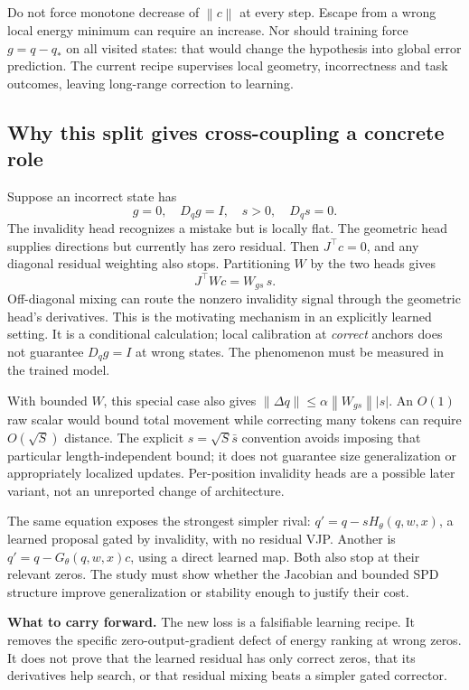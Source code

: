 \documentclass[11pt,a4paper]{article}
\newcommand{\takeaway}[1]{\par\smallskip\noindent\colorbox{pale}{\parbox{\dimexpr\linewidth-2\fboxsep\relax}{\textbf{What to carry forward.} #1}}\par\smallskip}
\newcommand{\norm}[1]{\left\lVert #1\right\rVert}
\begin{document}
Do not force monotone decrease of $\norm{c}$ at every step. Escape from a wrong local energy minimum can require an increase. Nor should training force $g=q-q_*$ on all visited states: that would change the hypothesis into global error prediction. The current recipe supervises local geometry, incorrectness and task outcomes, leaving long-range correction to learning.

\subsection{Why this split gives cross-coupling a concrete role}
Suppose an incorrect state has
\[
g=0,\quad D_qg=I,\quad s>0,\quad D_qs=0.
\]
The invalidity head recognizes a mistake but is locally flat. The geometric head supplies directions but currently has zero residual. Then $J^\top c=0$, and any diagonal residual weighting also stops. Partitioning $W$ by the two heads gives
\begin{equation}
J^\top Wc=W_{gs}\,s.\label{eq:bridge}
\end{equation}
Off-diagonal mixing can route the nonzero invalidity signal through the geometric head's derivatives. This is the motivating mechanism in an explicitly learned setting. It is a conditional calculation; local calibration at \emph{correct} anchors does not guarantee $D_qg=I$ at wrong states. The phenomenon must be measured in the trained model.

With bounded $W$, this special case also gives $\norm{\Delta q}\le\alpha\norm{W_{gs}}\vert s\vert$. An $O(1)$ raw scalar would bound total movement while correcting many tokens can require $O(\sqrt S)$ distance. The explicit $s=\sqrt S\bar s$ convention avoids imposing that particular length-independent bound; it does not guarantee size generalization or appropriately localized updates. Per-position invalidity heads are a possible later variant, not an unreported change of architecture.

The same equation exposes the strongest simpler rival: $q'=q-sH_\theta(q,w,x)$, a learned proposal gated by invalidity, with no residual VJP. Another is $q'=q-G_\theta(q,w,x)c$, using a direct learned map. Both also stop at their relevant zeros. The study must show whether the Jacobian and bounded SPD structure improve generalization or stability enough to justify their cost.

\takeaway{The new loss is a falsifiable learning recipe. It removes the specific zero-output-gradient defect of energy ranking at wrong zeros. It does not prove that the learned residual has only correct zeros, that its derivatives help search, or that residual mixing beats a simpler gated corrector.}
\end{document}
